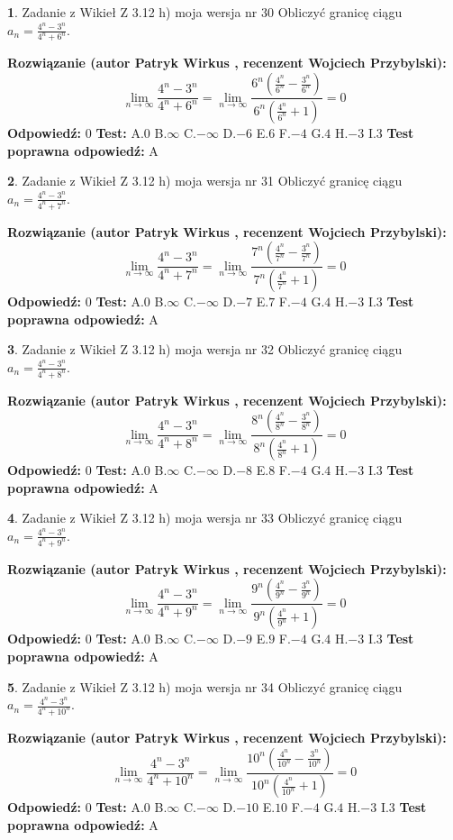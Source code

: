 \documentclass[12pt, a4paper]{article}
\theoremstyle{definition} %
\newtheorem{zad}{}
\newcommand{\zadStart}[1]{\begin{zad}#1\newline}
\newcommand{\zadStop}{\end{zad}}
\newcommand{\rozwStart}[2]{\noindent \textbf{Rozwiązanie (autor #1 , recenzent #2): }\newline}
\newcommand{\rozwStop}{\newline}
\newcommand{\odpStart}{\noindent \textbf{Odpowiedź:}\newline}
\newcommand{\odpStop}{\newline}
\newcommand{\testStart}{\noindent \textbf{Test:}\newline}
\newcommand{\testStop}{\newline}
\newcommand{\kluczStart}{\noindent \textbf{Test poprawna odpowiedź:}\newline}
\newcommand{\kluczStop}{\newline}
\begin{document}
\zadStart{Zadanie z Wikieł Z 3.12 h) moja wersja nr 30}
Obliczyć granicę ciągu $a_{n}=\frac{4^{n} - 3^{n}}{4^{n} + 6^{n}}$.
\zadStop
\rozwStart{Patryk Wirkus}{Wojciech Przybylski}
$$\lim\limits_{n\to\infty}\frac{4^{n} - 3^{n}}{4^{n} + 6^{n}} = \lim\limits_{n\to\infty}\frac{6^{n}(\frac{4^{n}}{6^{n}} - \frac{3^{n}}{6^{n}})}{6^{n}(\frac{4^{n}}{6^{n}} + 1)} = 0$$
\rozwStop
\odpStart
$0$
\odpStop
\testStart
A.$0$
B.$\infty$
C.$-\infty$
D.$-6$
E.$6$
F.$-4$
G.$4$
H.$-3$
I.$3$
\testStop
\kluczStart
A
\kluczStop



\zadStart{Zadanie z Wikieł Z 3.12 h) moja wersja nr 31}
Obliczyć granicę ciągu $a_{n}=\frac{4^{n} - 3^{n}}{4^{n} + 7^{n}}$.
\zadStop
\rozwStart{Patryk Wirkus}{Wojciech Przybylski}
$$\lim\limits_{n\to\infty}\frac{4^{n} - 3^{n}}{4^{n} + 7^{n}} = \lim\limits_{n\to\infty}\frac{7^{n}(\frac{4^{n}}{7^{n}} - \frac{3^{n}}{7^{n}})}{7^{n}(\frac{4^{n}}{7^{n}} + 1)} = 0$$
\rozwStop
\odpStart
$0$
\odpStop
\testStart
A.$0$
B.$\infty$
C.$-\infty$
D.$-7$
E.$7$
F.$-4$
G.$4$
H.$-3$
I.$3$
\testStop
\kluczStart
A
\kluczStop



\zadStart{Zadanie z Wikieł Z 3.12 h) moja wersja nr 32}
Obliczyć granicę ciągu $a_{n}=\frac{4^{n} - 3^{n}}{4^{n} + 8^{n}}$.
\zadStop
\rozwStart{Patryk Wirkus}{Wojciech Przybylski}
$$\lim\limits_{n\to\infty}\frac{4^{n} - 3^{n}}{4^{n} + 8^{n}} = \lim\limits_{n\to\infty}\frac{8^{n}(\frac{4^{n}}{8^{n}} - \frac{3^{n}}{8^{n}})}{8^{n}(\frac{4^{n}}{8^{n}} + 1)} = 0$$
\rozwStop
\odpStart
$0$
\odpStop
\testStart
A.$0$
B.$\infty$
C.$-\infty$
D.$-8$
E.$8$
F.$-4$
G.$4$
H.$-3$
I.$3$
\testStop
\kluczStart
A
\kluczStop



\zadStart{Zadanie z Wikieł Z 3.12 h) moja wersja nr 33}
Obliczyć granicę ciągu $a_{n}=\frac{4^{n} - 3^{n}}{4^{n} + 9^{n}}$.
\zadStop
\rozwStart{Patryk Wirkus}{Wojciech Przybylski}
$$\lim\limits_{n\to\infty}\frac{4^{n} - 3^{n}}{4^{n} + 9^{n}} = \lim\limits_{n\to\infty}\frac{9^{n}(\frac{4^{n}}{9^{n}} - \frac{3^{n}}{9^{n}})}{9^{n}(\frac{4^{n}}{9^{n}} + 1)} = 0$$
\rozwStop
\odpStart
$0$
\odpStop
\testStart
A.$0$
B.$\infty$
C.$-\infty$
D.$-9$
E.$9$
F.$-4$
G.$4$
H.$-3$
I.$3$
\testStop
\kluczStart
A
\kluczStop



\zadStart{Zadanie z Wikieł Z 3.12 h) moja wersja nr 34}
Obliczyć granicę ciągu $a_{n}=\frac{4^{n} - 3^{n}}{4^{n} + 10^{n}}$.
\zadStop
\rozwStart{Patryk Wirkus}{Wojciech Przybylski}
$$\lim\limits_{n\to\infty}\frac{4^{n} - 3^{n}}{4^{n} + 10^{n}} = \lim\limits_{n\to\infty}\frac{10^{n}(\frac{4^{n}}{10^{n}} - \frac{3^{n}}{10^{n}})}{10^{n}(\frac{4^{n}}{10^{n}} + 1)} = 0$$
\rozwStop
\odpStart
$0$
\odpStop
\testStart
A.$0$
B.$\infty$
C.$-\infty$
D.$-10$
E.$10$
F.$-4$
G.$4$
H.$-3$
I.$3$
\testStop
\kluczStart
A
\kluczStop
\end{document}
